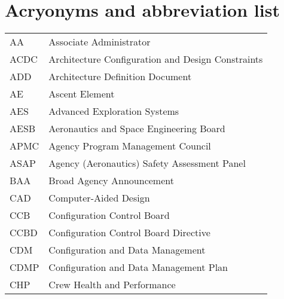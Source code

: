 \pagebreak
\section{Acryonyms and abbreviation list}
\par\vspace{0.5cm}
\begin{longtable}{ll}

    AA &                            Associate Administrator \\  
 
  ACDC &  Architecture Configuration and Design Constraints \\  
 
   ADD &                   Architecture Definition Document \\  
 
    AE &                                     Ascent Element \\  
 
   AES &                       Advanced Exploration Systems \\  
 
  AESB &            Aeronautics and Space Engineering Board \\  
 
  APMC &                  Agency Program Management Council \\  
 
  ASAP &       Agency (Aeronautics) Safety Assessment Panel \\  
 
   BAA &                          Broad Agency Announcement \\  
 
   CAD &                              Computer-Aided Design \\  
 
   CCB &                        Configuration Control Board \\  
 
  CCBD &              Configuration Control Board Directive \\  
 
   CDM &                  Configuration and Data Management \\  
 
  CDMP &             Configuration and Data Management Plan \\  
 
   CHP &                        Crew Health and Performance \\  
 

\end{longtable}
